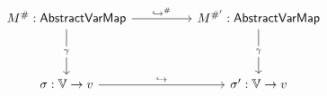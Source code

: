 \[\begin{tikzcd}
	{M^{\#} : \mathsf{AbstractVarMap}} && {M^{\#'} : \mathsf{AbstractVarMap}} \\
	\\
	{\sigma : \mathbb{V} \rightarrow v} && {\sigma' : \mathbb{V} \rightarrow v}
	\arrow["{\hookrightarrow^{\#}}", from=1-1, to=1-3]
	\arrow["\gamma"{description}, from=1-1, to=3-1]
	\arrow["\gamma"{description}, from=1-3, to=3-3]
	\arrow["\hookrightarrow", from=3-1, to=3-3]
\end{tikzcd}\]